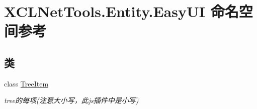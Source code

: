 \hypertarget{namespace_x_c_l_net_tools_1_1_entity_1_1_easy_u_i}{}\section{X\+C\+L\+Net\+Tools.\+Entity.\+Easy\+UI 命名空间参考}
\label{namespace_x_c_l_net_tools_1_1_entity_1_1_easy_u_i}
\subsection*{类}
\begin{DoxyCompactItemize}
\item 
class \hyperlink{class_x_c_l_net_tools_1_1_entity_1_1_easy_u_i_1_1_tree_item}{Tree\+Item}
\begin{DoxyCompactList}\small\item\em tree的每项(注意大小写，此js插件中是小写) \end{DoxyCompactList}\end{DoxyCompactItemize}
